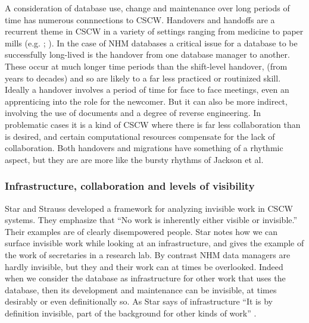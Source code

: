 A consideration of database use, change and maintenance over long periods of time has numerous connnections to CSCW. Handovers and handoffs are a recurrent theme in CSCW in a variety of settings ranging from medicine to paper mills (e.g. \cite{sarcevic2009information};  \cite{auramaki1996paperwork}). In the case of NHM databases a critical issue for a database to be successfully long-lived is the handover from one database manager to another. These occur at much longer time periods than the shift-level handover, (from years to decades) and so are likely to a far less practiced or routinized skill. Ideally a handover involves a period of time for face to face meetings, even an apprenticing into the role for the newcomer. But it can also be more indirect, involving the use of documents and a degree of reverse engineering. In problematic cases it is a kind of CSCW where there is far less collaboration than is desired, and certain computational resources compensate for the lack of collaboration. Both handovers and migrations have something of a rhythmic aspect, but they are are more like the bursty rhythms of Jackson et al. \cite{jackson2011collaborative}

\subsubsection{Infrastructure, collaboration and levels of visibility}

Star and Strauss \cite{star1999layers} developed a framework for analyzing invisible work in CSCW systems. They emphasize that “No work is inherently either visible or invisible.” Their examples are of clearly disempowered people. Star \cite{star1999ethnography} notes how we can surface invisible work while looking at an infrastructure, and gives the example of the work of secretaries in a research lab. By contrast NHM data managers are hardly invisible, but they and their work can at times be overlooked. Indeed when we consider the database as infrastructure for other work that uses the database, then its development and maintenance can be invisible, at times desirably or even definitionally so. As Star says of infrastructure “It is by definition invisible, part of the background for other kinds of work” \cite{star1999ethnography}.

